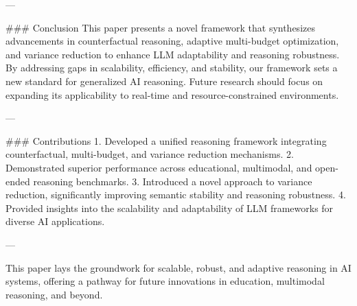---

### Conclusion
This paper presents a novel framework that synthesizes advancements in counterfactual reasoning, adaptive multi-budget optimization, and variance reduction to enhance LLM adaptability and reasoning robustness. By addressing gaps in scalability, efficiency, and stability, our framework sets a new standard for generalized AI reasoning. Future research should focus on expanding its applicability to real-time and resource-constrained environments.

---

### Contributions
1. Developed a unified reasoning framework integrating counterfactual, multi-budget, and variance reduction mechanisms.
2. Demonstrated superior performance across educational, multimodal, and open-ended reasoning benchmarks.
3. Introduced a novel approach to variance reduction, significantly improving semantic stability and reasoning robustness.
4. Provided insights into the scalability and adaptability of LLM frameworks for diverse AI applications.

--- 

This paper lays the groundwork for scalable, robust, and adaptive reasoning in AI systems, offering a pathway for future innovations in education, multimodal reasoning, and beyond.